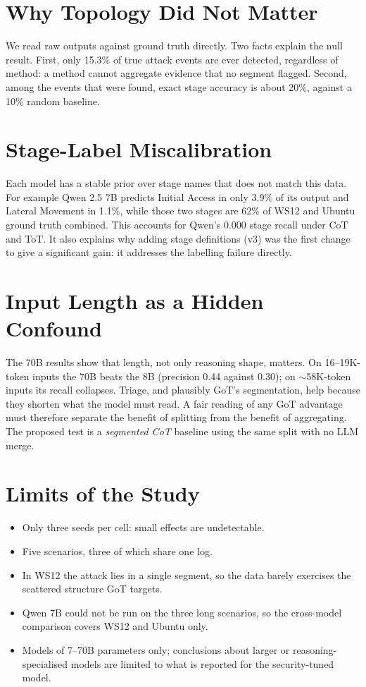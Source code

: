 \documentclass[a4paper, 12pt]{report}
\theoremstyle{definition}
\begin{document}
\section{Why Topology Did Not Matter}
We read raw outputs against ground truth directly. Two facts explain the null result. First, only 15.3\% of true attack events are ever detected, regardless of method: a method cannot aggregate evidence that no segment flagged. Second, among the events that were found, exact stage accuracy is about 20\%, against a 10\% random baseline.

\section{Stage-Label Miscalibration}
Each model has a stable prior over stage names that does not match this data. For example Qwen 2.5 7B predicts Initial Access in only 3.9\% of its output and Lateral Movement in 1.1\%, while those two stages are 62\% of WS12 and Ubuntu ground truth combined. This accounts for Qwen's 0.000 stage recall under CoT and ToT. It also explains why adding stage definitions (v3) was the first change to give a significant gain: it addresses the labelling failure directly.

\section{Input Length as a Hidden Confound}
The 70B results show that length, not only reasoning shape, matters. On 16--19K-token inputs the 70B beats the 8B (precision 0.44 against 0.30); on $\sim$58K-token inputs its recall collapses. Triage, and plausibly GoT's segmentation, help because they shorten what the model must read. A fair reading of any GoT advantage must therefore separate the benefit of splitting from the benefit of aggregating. The proposed test is a \emph{segmented CoT} baseline using the same split with no LLM merge.

\section{Limits of the Study}
\begin{itemize}
	\item Only three seeds per cell: small effects are undetectable.
	\item Five scenarios, three of which share one log.
	\item In WS12 the attack lies in a single segment, so the data barely exercises the scattered structure GoT targets.
	\item Qwen 7B could not be run on the three long scenarios, so the cross-model comparison covers WS12 and Ubuntu only.
	\item Models of 7--70B parameters only; conclusions about larger or reasoning-specialised models are limited to what is reported for the security-tuned model.
\end{itemize}
\end{document}
